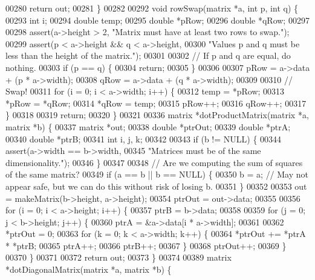 \begin{DoxyCode}
{{00280   \textcolor{keywordflow}{return} out;
00281 \}
00282 
00292 \textcolor{keywordtype}{void} rowSwap(matrix *a, \textcolor{keywordtype}{int} p, \textcolor{keywordtype}{int} q) \{
00293   \textcolor{keywordtype}{int} i;
00294   \textcolor{keywordtype}{double} temp;
00295   \textcolor{keywordtype}{double} *pRow;
00296   \textcolor{keywordtype}{double} *qRow;
00297 
00298   assert(a->height > 2, \textcolor{stringliteral}{"Matrix must have at least two rows to swap."});
00299   assert(p < a->height && q < a->height,
00300          \textcolor{stringliteral}{"Values p and q must be less than the height of the matrix."});
00301 
00302   \textcolor{comment}{// If p and q are equal, do nothing.}
00303   \textcolor{keywordflow}{if} (p == q) \{
00304     \textcolor{keywordflow}{return};
00305   \}
00306 
00307   pRow = a->data + (p * a->width);
00308   qRow = a->data + (q * a->width);
00309 
00310   \textcolor{comment}{// Swap!}
00311   \textcolor{keywordflow}{for} (i = 0; i < a->width; i++) \{
00312     temp = *pRow;
00313     *pRow = *qRow;
00314     *qRow = temp;
00315     pRow++;
00316     qRow++;
00317   \}
00318 
00319   \textcolor{keywordflow}{return};
00320 \}
00321 
00336 matrix *dotProductMatrix(matrix *a, matrix *b) \{
00337   matrix *out;
00338   \textcolor{keywordtype}{double} *ptrOut;
00339   \textcolor{keywordtype}{double} *ptrA;
00340   \textcolor{keywordtype}{double} *ptrB;
00341   \textcolor{keywordtype}{int} i, j, k;
00342 
00343   \textcolor{keywordflow}{if} (b != NULL) \{
00344     assert(a->width == b->width,
00345            \textcolor{stringliteral}{"Matrices must be of the same dimensionality."});
00346   \}
00347 
00348   \textcolor{comment}{// Are we computing the sum of squares of the same matrix?}
00349   \textcolor{keywordflow}{if} (a == b || b == NULL) \{
00350     b = a; \textcolor{comment}{// May not appear safe, but we can do this without risk of losing b.}
00351   \}
00352 
00353   out = makeMatrix(b->height, a->height);
00354   ptrOut = out->data;
00355 
00356   \textcolor{keywordflow}{for} (i = 0; i < a->height; i++) \{
00357     ptrB = b->data;
00358 
00359     \textcolor{keywordflow}{for} (j = 0; j < b->height; j++) \{
00360       ptrA = &a->data[i * a->width];
00361 
00362       *ptrOut = 0;
00363       \textcolor{keywordflow}{for} (k = 0; k < a->width; k++) \{
00364         *ptrOut += *ptrA * *ptrB;
00365         ptrA++;
00366         ptrB++;
00367       \}
00368       ptrOut++;
00369     \}
00370   \}
00371 
00372   \textcolor{keywordflow}{return} out;
00373 \}
00374 
00389 matrix *dotDiagonalMatrix(matrix *a, matrix *b) \{
}}
\end{DoxyCode}

